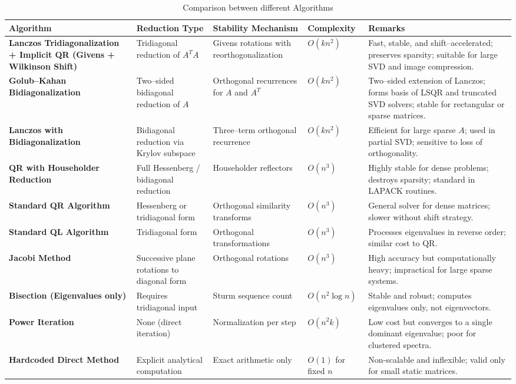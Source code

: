 \begin{table}[h!]
\centering
\renewcommand{\arraystretch}{1.3}
\setlength{\tabcolsep}{5pt}
\begin{tabular}{|p{3.5cm}|p{3cm}|p{3cm}|p{2.2cm}|p{5.2cm}|}
\hline
\textbf{Algorithm} &
\textbf{Reduction Type} &
\textbf{Stability Mechanism} &
\textbf{Complexity} &
\textbf{Remarks} \\
\hline
\textbf{Lanczos Tridiagonalization + Implicit QR (Givens + Wilkinson Shift)} &
Tridiagonal reduction of \(A^T A\) &
Givens rotations with reorthogonalization &
\(O(k n^2)\) &
Fast, stable, and shift–accelerated; preserves sparsity; suitable for large SVD and image compression. \\
\hline
\textbf{Golub--Kahan Bidiagonalization} &
Two–sided bidiagonal reduction of \(A\) &
Orthogonal recurrences for \(A\) and \(A^T\) &
\(O(k n^2)\) &
Two–sided extension of Lanczos; forms basis of LSQR and truncated SVD solvers; stable for rectangular or sparse matrices. \\
\hline
\textbf{Lanczos with Bidiagonalization} &
Bidiagonal reduction via Krylov subspace &
Three–term orthogonal recurrence &
\(O(k n^2)\) &
Efficient for large sparse \(A\); used in partial SVD; sensitive to loss of orthogonality. \\
\hline
\textbf{QR with Householder Reduction} &
Full Hessenberg / bidiagonal reduction &
Householder reflectors &
\(O(n^3)\) &
Highly stable for dense problems; destroys sparsity; standard in LAPACK routines. \\
\hline
\textbf{Standard QR Algorithm} &
Hessenberg or tridiagonal form &
Orthogonal similarity transforms &
\(O(n^3)\) &
General solver for dense matrices; slower without shift strategy. \\
\hline
\textbf{Standard QL Algorithm} &
Tridiagonal form &
Orthogonal transformations &
\(O(n^3)\) &
Processes eigenvalues in reverse order; similar cost to QR. \\
\hline
\textbf{Jacobi Method} &
Successive plane rotations to diagonal form &
Orthogonal rotations &
\(O(n^3)\) &
High accuracy but computationally heavy; impractical for large sparse systems. \\
\hline
\textbf{Bisection (Eigenvalues only)} &
Requires tridiagonal input &
Sturm sequence count &
\(O(n^2 \log n)\) &
Stable and robust; computes eigenvalues only, not eigenvectors. \\
\hline
\textbf{Power Iteration} &
None (direct iteration) &
Normalization per step &
\(O(n^2 k)\) &
Low cost but converges to a single dominant eigenvalue; poor for clustered spectra. \\
\hline
\textbf{Hardcoded Direct Method} &
Explicit analytical computation &
Exact arithmetic only &
\(O(1)\) for fixed \(n\) &
Non-scalable and inflexible; valid only for small static matrices. \\
\hline
\end{tabular}
\caption{Comparison between different Algorithms}
\label{tablealgo}
\end{table}
